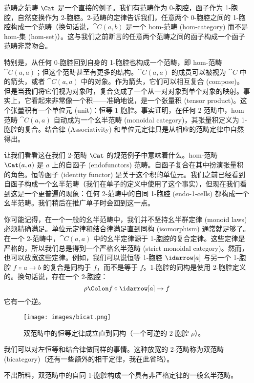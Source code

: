\noindent
范畴之范畴 $\Cat$ 是一个直接的例子。我们有范畴作为 0-胞腔，函子作为 1-胞腔，自然变换作为 2-胞腔。2-范畴的定律告诉我们，任意两个 0-胞腔之间的 1-胞腔构成一个范畴（换句话说，$\cat{C}(a, b)$ 是一个 hom-范畴 (hom-category) 而不是 hom-集 (hom-set)）。这与我们之前断言的任意两个范畴之间的函子构成一个函子范畴非常吻合。

特别是，从任何 0-胞腔回到自身的 1-胞腔也构成一个范畴，即 hom-范畴 $\cat{C}(a, a)$；但这个范畴甚至有更多的结构。$\cat{C}(a, a)$ 的成员可以被视为 $\cat{C}$ 中的箭头，或者 $\cat{C}(a, a)$ 中的对象。作为箭头，它们可以相互复合 (compose)。但是当我们将它们视为对象时，复合变成了一个从一对对象到单个对象的映射。事实上，它看起来非常像一个积——准确地说，是一个张量积 (tensor product)。这个张量积有一个单位元 (unit)：恒等 1-胞腔。事实证明，在任何 2-范畴中，hom-范畴 $\cat{C}(a, a)$ 自动成为一个幺半范畴 (monoidal category)，其张量积定义为 1-胞腔的复合。结合律 (Associativity) 和单位元定律只是从相应的范畴定律中自然得出。

让我们看看这在我们 2-范畴 $\Cat$ 的规范例子中意味着什么。hom-范畴 $\Cat(a, a)$ 是 $a$ 上的自函子 (endofunctors) 范畴。自函子复合在其中扮演张量积的角色。恒等函子 (identity functor) 是关于这个积的单位元。我们之前已经看到自函子构成一个幺半范畴（我们在单子的定义中使用了这个事实），但现在我们看到这是一个更普遍的现象：任何 2-范畴中的自同 1-胞腔 (endo-1-cells) 都构成一个幺半范畴。我们稍后在推广单子时会回到这一点。

你可能记得，在一个一般的幺半范畴中，我们并不坚持幺半群定律 (monoid laws) 必须精确满足。单位元定律和结合律满足直到同构 (isomorphism) 通常就足够了。在一个 2-范畴中，$\cat{C}(a, a)$ 中的幺半定律源于 1-胞腔的复合定律。这些定律是严格的，所以我们总是得到一个严格幺半范畴 (strict monoidal category)。然而，也可以放宽这些定律。例如，我们可以说恒等 1-胞腔 $\idarrow[a]$ 与另一个 1-胞腔 $f \Colon a \to b$ 的复合是同构于 $f$，而不是等于 $f$。1-胞腔的同构是使用 2-胞腔定义的。换句话说，存在一个 2-胞腔：
\[\rho \Colon f \circ \idarrow[a] \to f\]
它有一个逆。

\begin{figure}[H]
  \centering
  \texttt{[image: images/bicat.png]}
  \caption{双范畴中的恒等定律成立直到同构（一个可逆的 2-胞腔 $\rho$）。}
\end{figure}

\noindent
我们可以对左恒等和结合律做同样的事情。这种放宽的 2-范畴称为双范畴 (bicategory)（还有一些额外的相干定律，我在此省略）。

不出所料，双范畴中的自同 1-胞腔构成一个具有非严格定律的一般幺半范畴。

